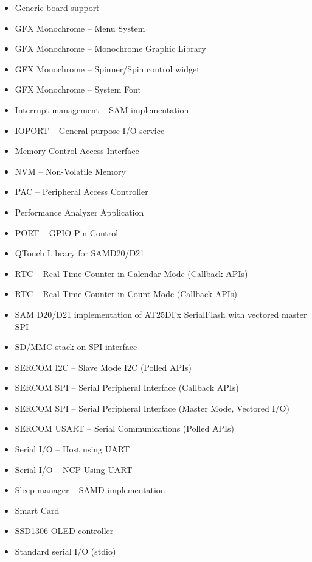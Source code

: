 \begin{multicols}{2}
\begin{flushleft}
\begin{itemize}
            \item Generic board support
            \item GFX Monochrome -- Menu System
            \item GFX Monochrome -- Monochrome Graphic Library
            \item GFX Monochrome -- Spinner/Spin control widget
            \item GFX Monochrome -- System Font
            \item Interrupt management -- SAM implementation
            \item IOPORT -- General purpose I/O service
            \item Memory Control Access Interface
            \item NVM -- Non-Volatile Memory
            \item PAC -- Peripheral Access Controller
            \item Performance Analyzer Application
            \item PORT -- GPIO Pin Control
            \item QTouch Library for SAMD20/D21
            \item RTC -- Real Time Counter in Calendar Mode (Callback \ac{API}s)
            \item RTC -- Real Time Counter in Count Mode (Callback \ac{API}s)
            \item SAM D20/D21 implementation of AT25DFx SerialFlash with vectored master SPI
            \item SD/MMC stack on SPI interface
            \item SERCOM I2C -- Slave Mode I2C (Polled \ac{API}s)
            \item SERCOM SPI -- Serial Peripheral Interface (Callback \ac{API}s)
            \item SERCOM SPI -- Serial Peripheral Interface (Master Mode, Vectored I/O)
            \item SERCOM USART -- Serial Communications (Polled \ac{API}s)
            \item Serial I/O -- Host using UART
            \item Serial I/O -- NCP Using UART
            \item Sleep manager -- SAMD implementation
            \item Smart Card
            \item SSD1306 OLED controller
            \item Standard serial I/O (stdio)

\end{itemize}
\end{flushleft}
\end{multicols}
